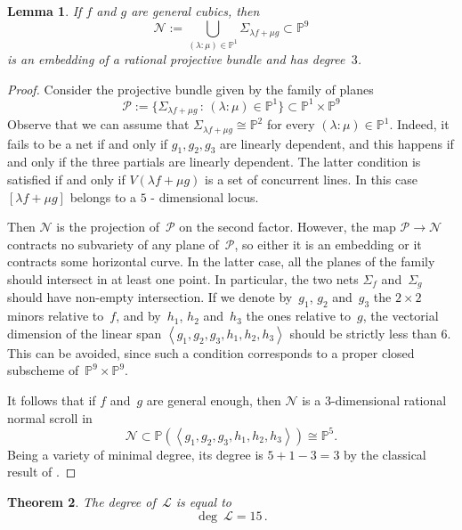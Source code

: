 \documentclass[a4paper, 11pt, reqno]{amsart}
\theoremstyle{plain}
\newtheorem{lemma}{Lemma}[section]
\newtheorem{theorem}[lemma]{Theorem}
\theoremstyle{definition}
\newcommand{\p}{\mathbb{P}}
\newcommand{\sL}{\mathcal{L}}
\begin{document}
\begin{lemma}
\label{lemma:scroll}
If $f$ and $g$ are general cubics, then
%
\[
  \mathcal{N} := \bigcup_{(\lambda : \mu) \in \p^1} \Sigma_{\lambda f + \mu g} \subset \p^9
\]
%
is an embedding of a rational projective bundle and has degree~$3$.
\end{lemma}
\begin{proof}
Consider the projective bundle given by the family of planes
%
\[
  \mathcal{P} := \{ \Sigma_{\lambda f + \mu g} \, : \, (\lambda: \mu) \in \p^1 \} \subset \p^1 \times \p^9
\]
%
Observe that we can assume that $\Sigma_{\lambda f + \mu g} \cong \p^2$
for every $(\lambda:\mu) \in \p^1$. Indeed, it fails to be a net if and only if $g_1,g_2,g_3$ are linearly dependent, and this happens if and only if the three partials are linearly dependent. The latter condition is satisfied if and only if $V(\lambda f + \mu g)$ is a set of concurrent lines. In this case $[\lambda f + \mu g]$ belongs to a $5$ - dimensional locus.

Then $\mathcal{N}$ is the projection of~$\mathcal{P}$ on the second factor.
However, the map $\mathcal{P} \to \mathcal{N}$ contracts no subvariety of any plane of~$\mathcal{P}$, so either it is an embedding or it contracts some horizontal curve. In the latter case, all the planes of the family should intersect in at least one point. In particular, the two nets $\Sigma_f$ and~$\Sigma_g$ should have non-empty intersection.
If we denote by~$g_1$, $g_2$ and~$g_3$ the $2 \times 2$ minors relative to~$f$, and by~$h_1$, $h_2$ and~$h_3$ the ones relative to~$g$, the vectorial dimension of the linear span $\left\langle g_1, g_2, g_3, h_1, h_2, h_3 \right\rangle$ should be strictly less than $6$. This can be avoided, since such a condition corresponds to a proper closed subscheme of~$\p^9 \times \p^9$.

It follows that if $f$ and~$g$ are general enough, then $\mathcal{N}$ is a $3$-dimensional rational normal scroll in
%
\[
  \mathcal{N} \subset \p(\left\langle g_1, g_2, g_3, h_1, h_2, h_3 \right\rangle) \cong \p^5.
\]
%
Being a variety of minimal degree, its degree is $5+1-3 = 3$ by the classical result of \cite{EH}.
\end{proof}

\begin{theorem}
The degree of~$\sL$ is equal to
%
\[
  \deg \ \sL = 15 \,.
\]
%
\end{theorem}
\end{document}
